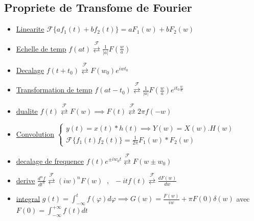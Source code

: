 \documentclass[12pt]{book}
\newcommand{\fourier}{\mathcal{F}}
\begin{document}
            \subsection{Propriete de Transfome de Fourier}
                \begin{itemize}
                    \item \underline{Linearite} $\fourier\{ af_1(t) +bf_2(t) \} = aF_1(w) + bF_2(w)$
                    \item \underline{Echelle de temp} $f(at)\overset{\fourier}{\rightleftarrows}\frac{1}{|a|}F(\frac{w}{a})$
                    \item \underline{Decalage} $f(t+t_0)\overset{\fourier}{\rightleftarrows}F(w_0)e^{iwt_0}$
                    \item \underline{Transformation de temp} $f(at-t_0)\overset{\fourier}{\rightleftarrows}\frac{1}{|a|}F(\frac{w}{a})e^{it_0\frac{w}{a}}$
                    \item \underline{dualite} $f(t)\overset{\fourier}{\rightleftarrows}F(w) \implies F(t)\overset{\fourier}{\rightleftarrows} 2\pi f(-w)$
                    \item \underline{Convolution} $\begin{cases}
                        y(t)=x(t)*h(t) \implies Y(w)=X(w).H(w) \\
                        \fourier\{ f_1(t)f_2(t) \} = \frac{1}{2\pi}F_1(w)*F_2(w)
                        \end{cases}$
                    \item \underline{decalage de frequence} $f(t)e^{\pm iw_0t} \overset{\fourier}{\rightleftarrows} F(w\pm w_0)$
                    \item \underline{derive} $\frac{d^nf}{dt^n}\overset{\fourier}{\rightleftarrows}(iw)^nF(w) \; \; , \; \; -itf(t)\overset{\fourier}{\rightleftarrows}\frac{dF(w)}{dw}$
                    \item \underline{integral} $g(t) = \int^t_{-\infty}f(\varphi)d\varphi \implies G(w) = \frac{F(w)}{iw}+\pi F(0)\delta(w)$ avec $F(0) = \int^{+\infty}_{-\infty}f(t)dt$
                \end{itemize}
\end{document}
